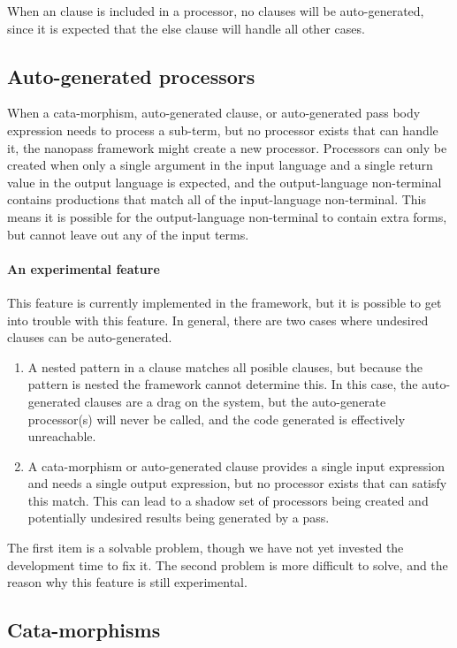 \documentclass[letterpaper,10pt]{article}
\begin{document}
When an  clause is included in a processor, no clauses will be
auto-generated, since it is expected that the else clause will handle all other
cases.

\subsection{Auto-generated processors}

When a cata-morphism, auto-generated clause, or auto-generated pass body
expression needs to process a sub-term, but no processor exists that can handle
it, the nanopass framework might create a new processor.
Processors can only be created when only a single argument in the input
language and a single return value in the output language is expected, and the
output-language non-terminal contains productions that match all of the
input-language non-terminal.
This means it is possible for the output-language non-terminal to contain extra
forms, but cannot leave out any of the input terms.

\paragraph{An experimental feature}
This feature is currently implemented in the framework, but it is possible to
get into trouble with this feature.
In general, there are two cases where undesired clauses can be auto-generated.
\begin{enumerate}
\item A nested pattern in a clause matches all posible clauses, but because the
pattern is nested the framework cannot determine this.
In this case, the
auto-generated clauses are a drag on the system, but the auto-generate
processor(s) will never be called, and the code generated is effectively
unreachable.
\item A cata-morphism or auto-generated clause provides a single input expression
and needs a single output expression, but no processor exists that can satisfy
this match.  This can lead to a shadow set of processors being created and
potentially undesired results being generated by a pass.
\end{enumerate}

The first item is a solvable problem, though we have not yet invested the
development time to fix it.  The second problem is more difficult to solve, and
the reason why this feature is still experimental.

\subsection{Cata-morphisms}
\end{document}
